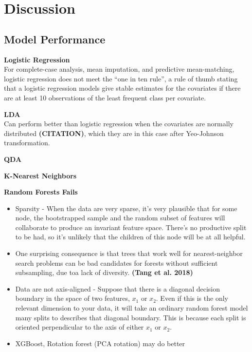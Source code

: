 \documentclass[12pt,]{article}
\begin{document}
\newpage

\section{Discussion}\label{discussion}

\subsection{Model Performance}\label{model-performance}

\textbf{Logistic Regression}\\
For complete-case analysis, mean imputation, and predictive
mean-matching, logistic regression does not meet the ``one in ten
rule'', a rule of thumb stating that a logistic regression models give
stable estimates for the covariates if there are at least 10
observations of the least frequent class per covariate.

\textbf{LDA}\\
Can perform better than logistic regression when the covariates are
normally distributed \textbf{(CITATION)}, which they are in this case
after Yeo-Johnson transformation.

\textbf{QDA}

\textbf{K-Nearest Neighbors}

\textbf{Random Forests Fails}

\begin{itemize}
\item
  Sparsity - When the data are very sparse, it's very plausible that for
  some node, the bootstrapped sample and the random subset of features
  will collaborate to produce an invariant feature space. There's no
  productive split to be had, so it's unlikely that the children of this
  node will be at all helpful.
\item
  One surprising consequence is that trees that work well for
  nearest-neighbor search problems can be bad candidates for forests
  without sufficient subsampling, due toa lack of diversity.
  \textbf{(Tang et al. 2018)}
\item
  Data are not axis-aligned - Suppose that there is a diagonal decision
  boundary in the space of two features, \(x_1\) or \(x_2\). Even if
  this is the only relevant dimension to your data, it will take an
  ordinary random forest model many splits to describes that diagonal
  boundary. This is because each split is oriented perpendicular to the
  axis of either \(x_1\) or \(x_2\).
\item
  XGBoost, Rotation forest (PCA rotation) may do better
\end{itemize}
\end{document}
